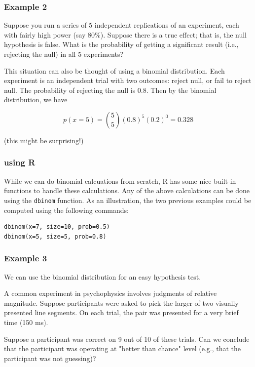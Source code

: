 \documentclass[11pt]{article}
\begin{document}
\subsubsection*{Example 2}
\label{sec-2-1-2}
Suppose you run a series of 5 independent replications of an experiment, each with fairly high power (say 80\%).  Suppose there is a true effect; that is, the null hypothesis is false.  What is the probability of getting a significant result (i.e., rejecting the null) in all 5 experiments?

This situation can also be thought of using a binomial distribution.  Each experiment is an independent trial with two outcomes: reject null, or fail to reject null.  The probability of rejecting the null is 0.8.  Then by the binomial distribution, we have

\[
p(x=5) = {5\choose 5} (0.8)^5(0.2)^0 = 0.328
\]

(this might be surprising!)

\subsubsection*{using R}
\label{sec-2-1-3}

While we can do binomial calcuations from scratch, R has some nice built-in functions to handle these calculations.  Any of the above calculations can be done using the \texttt{dbinom} function.  As an illustration, the two previous examples could be computed using the following commands:

\begin{verbatim}
dbinom(x=7, size=10, prob=0.5)
dbinom(x=5, size=5, prob=0.8)
\end{verbatim}

\subsubsection*{Example 3}
\label{sec-2-1-4}
We can use the binomial distribution for an easy hypothesis test. 

A common experiment in psychophysics involves judgments of relative magnitude.  Suppose participants were asked to pick the larger of two visually presented line segments.  On each trial, the pair was presented for a very brief time (150 ms).  

Suppose a participant was correct on 9 out of 10 of these trials.  Can we conclude that the participant was operating at "better than chance" level (e.g., that the participant was not guessing)?
\end{document}

